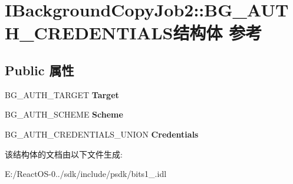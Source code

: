 \hypertarget{struct_i_background_copy_job2_1_1_b_g___a_u_t_h___c_r_e_d_e_n_t_i_a_l_s}{}\section{I\+Background\+Copy\+Job2\+:\+:B\+G\+\_\+\+A\+U\+T\+H\+\_\+\+C\+R\+E\+D\+E\+N\+T\+I\+A\+L\+S结构体 参考}
\label{struct_i_background_copy_job2_1_1_b_g___a_u_t_h___c_r_e_d_e_n_t_i_a_l_s}
\subsection*{Public 属性}
\begin{DoxyCompactItemize}
\item 
\mbox{\label{struct_i_background_copy_job2_1_1_b_g___a_u_t_h___c_r_e_d_e_n_t_i_a_l_s_a2ae97b527046c7139581c5527f710ff8}} 
B\+G\+\_\+\+A\+U\+T\+H\+\_\+\+T\+A\+R\+G\+ET {\bfseries Target}
\item 
\mbox{\label{struct_i_background_copy_job2_1_1_b_g___a_u_t_h___c_r_e_d_e_n_t_i_a_l_s_a39040430218581bbc1f23b7ac177c6c7}} 
B\+G\+\_\+\+A\+U\+T\+H\+\_\+\+S\+C\+H\+E\+ME {\bfseries Scheme}
\item 
\mbox{\label{struct_i_background_copy_job2_1_1_b_g___a_u_t_h___c_r_e_d_e_n_t_i_a_l_s_a5a9257c0389e45d0810b622f1e976c5f}} 
B\+G\+\_\+\+A\+U\+T\+H\+\_\+\+C\+R\+E\+D\+E\+N\+T\+I\+A\+L\+S\+\_\+\+U\+N\+I\+ON {\bfseries Credentials}
\end{DoxyCompactItemize}


该结构体的文档由以下文件生成\+:\begin{DoxyCompactItemize}
\item 
E\+:/\+React\+O\+S-\/0../sdk/include/psdk/bits1\+\_.\+idl\end{DoxyCompactItemize}
